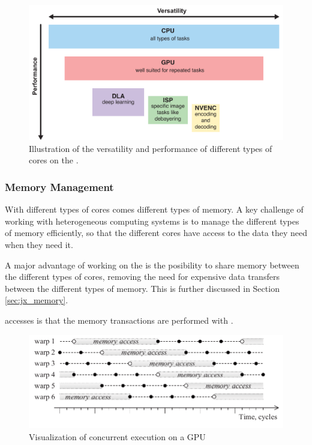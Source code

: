 \begin{figure}
    \centering
    \includegraphics[width=\textwidth]{figures/PDF/jx_hierarchy.pdf}
    \caption{Illustration of the versatility and performance of different types of cores on the \jx.}
    \label{fig:jx_hierarchy}
\end{figure}


\subsubsection{Memory Management}
With different types of cores comes different types of memory.
A key challenge of working with heterogeneous computing systems is to manage the different types of memory efficiently, so that the different cores have access to the data they need when they need it.

A major advantage of working on the \jx is the posibility to share memory between the different types of cores, removing the need for expensive data transfers between the different types of memory.
This is further discussed in Section \ref{sec:jx_memory}.


accesses is that the memory transactions are performed with  \cite[13]{volkovLatencyHiding2016}.

\begin{figure}
    \centering
    \includegraphics[width=\textwidth]{figures/PDF/concurrency_p54.pdf}
    \caption{Visualization of concurrent execution on a GPU \cite[54]{volkovLatencyHiding2016}}
    \label{fig:concurrency}
\end{figure}


